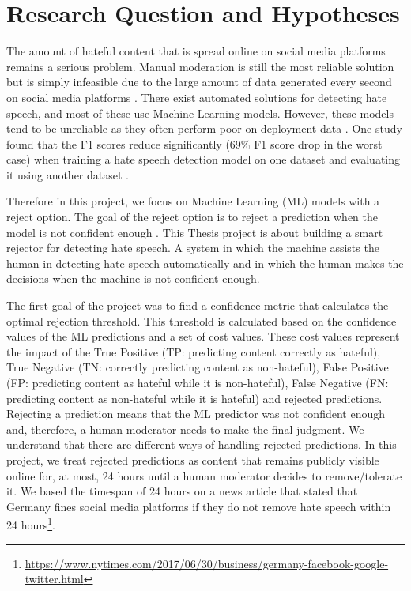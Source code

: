 \documentclass[a4paper]{article}
\begin{document}
\tableofcontents

\section{Research Question and Hypotheses}
The amount of hateful content that is spread online on social media platforms remains a serious problem. Manual moderation is still the most reliable solution but is simply infeasible due to the large amount of data generated every second on social media platforms \cite{balayn2021automatic}. There exist automated solutions for detecting hate speech, and most of these use Machine Learning models. However, these models tend to be unreliable as they often perform poor on deployment data \cite{balayn2021automatic, grondahl2018all}. One study found that the F1 scores reduce significantly (69\% F1 score drop in the worst case) when training a hate speech detection model on one dataset and evaluating it using another dataset \cite{grondahl2018all}.

Therefore in this project, we focus on Machine Learning (ML) models with a reject option. The goal of the reject option is to reject a prediction when the model is not confident enough \cite{hendrickx2021machine}. This Thesis project is about building a smart rejector for detecting hate speech. A system in which the machine assists the human in detecting hate speech automatically and in which the human makes the decisions when the machine is not confident enough.

The first goal of the project was to find a confidence metric that calculates the optimal rejection threshold. This threshold is calculated based on the confidence values of the ML predictions and a set of cost values. These cost values represent the impact of the True Positive (TP: predicting content correctly as hateful), True Negative (TN: correctly predicting content as non-hateful), False Positive (FP: predicting content as hateful while it is non-hateful), False Negative (FN: predicting content as non-hateful while it is hateful) and rejected predictions. Rejecting a prediction means that the ML predictor was not confident enough and, therefore, a human moderator needs to make the final judgment. We understand that there are different ways of handling rejected predictions. In this project, we treat rejected predictions as content that remains publicly visible online for, at most, 24 hours until a human moderator decides to remove/tolerate it. We based the timespan of 24 hours on a news article that stated that Germany fines social media platforms if they do not remove hate speech within 24 hours\footnote{\url{https://www.nytimes.com/2017/06/30/business/germany-facebook-google-twitter.html}}.
\end{document}
